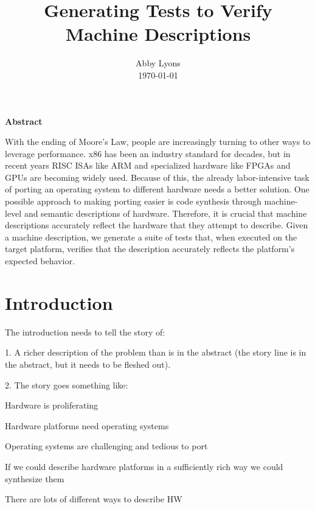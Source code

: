 \documentclass[letterpaper,12pt]{article}
\begin{document}
\title{\bf \LARGE Generating Tests to Verify Machine Descriptions}

\author{
{\rm Abby Lyons}\\
{\rm \today}
}
\maketitle
\thispagestyle{empty}

\vspace*{2\baselineskip}
{\centering
  \bf{Abstract}\par
}
With the ending of Moore's Law, people are increasingly turning to other ways to leverage performance. x86 has been an industry standard for decades, but in recent years RISC ISAs like ARM and specialized hardware like FPGAs and GPUs are becoming widely used. Because of this, the already labor-intensive task of porting an operating system to different hardware needs a better solution. One possible approach to making porting easier is code synthesis through machine-level and semantic descriptions of hardware. Therefore, it is crucial that machine descriptions accurately reflect the hardware that they attempt to describe. Given a machine description, we generate a suite of tests that, when executed on the target platform, verifies that the description accurately reflects the platform's expected behavior.

\pagebreak

\tableofcontents

\pagebreak

\section{Introduction}

The introduction needs to tell the story of:

1. A richer description of the problem than is in the abstract (the story line is in the abstract, but it needs to be fleshed out).

2. The story goes something like:

Hardware is proliferating

Hardware platforms need operating systems

Operating systems are challenging and tedious to port

If we could describe hardware platforms in a sufficiently rich way we could synthesize them

There are lots of different ways to describe HW
\end{document}

